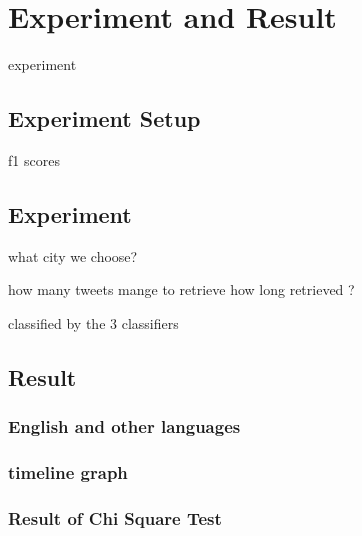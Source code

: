 \chapter{Experiment and Result}
experiment
\section{Experiment Setup}
f1 scores

\section{Experiment}
what city we choose?

how many tweets mange to retrieve
how long retrieved ?

classified by the 3 classifiers

\section{Result}
\subsection{English and other languages}

\subsection{timeline graph}

\subsection{Result of Chi Square Test}
